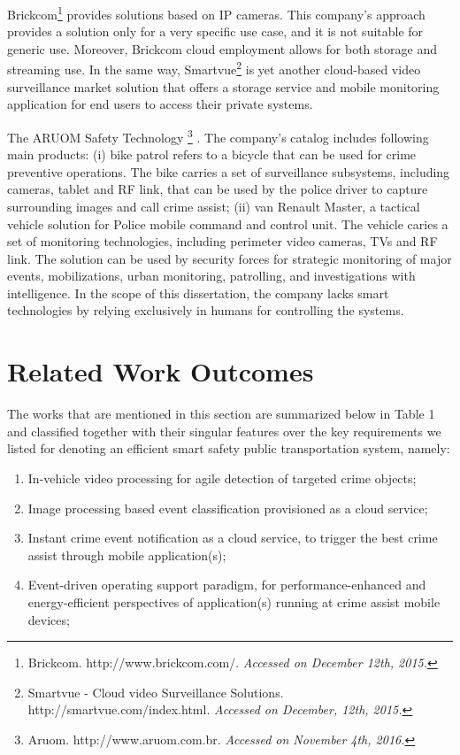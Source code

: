 Brickcom\footnote[14]{Brickcom. http://www.brickcom.com/. \textit{Accessed on December 12th, 2015.}} provides solutions based on IP cameras. This company's approach provides a solution only for a very specific use case, and it is not suitable for generic use. Moreover,  Brickcom cloud employment allows for both storage and streaming use. In the same way, Smartvue\footnote[15]{Smartvue - Cloud video Surveillance Solutions. http://smartvue.com/index.html. \textit{Accessed on December, 12th, 2015.}} is yet another cloud-based video surveillance market solution that offers a storage service and mobile monitoring application for end users to access their private systems.

The ARUOM Safety Technology \footnote[16]{Aruom. http://www.aruom.com.br. \textit{Accessed on November 4th, 2016.}} . The company's catalog includes following main products: (i) bike patrol refers to a bicycle that can be used for crime preventive operations. The bike carries a set of surveillance subsystems, including cameras, tablet and RF link, that can be used by the police driver to capture surrounding images and call crime assist; (ii) van Renault Master, a tactical vehicle solution for Police mobile command and control unit. The vehicle  caries a set of monitoring technologies, including perimeter video cameras, TVs and RF link. The solution can be used by security forces for strategic monitoring of major events, mobilizations, urban monitoring, patrolling, and investigations with intelligence. In the scope of this dissertation, the company lacks smart technologies by relying exclusively in humans for controlling the systems.  

\section{Related Work Outcomes}

The works that are mentioned in this section are summarized below in Table 1 and classified together with their singular features over the key requirements we listed for denoting an efficient smart safety public transportation system, namely:


\begin{enumerate}
\item In-vehicle video processing for agile detection of targeted crime objects;
\item Image processing based event classification provisioned as a cloud service;
\item Instant crime event notification as a cloud service, to trigger the best crime assist through mobile application(s);
\item Event-driven operating support paradigm, for performance-enhanced and energy-efficient perspectives of application(s) running at crime assist mobile devices;
\end{enumerate}

